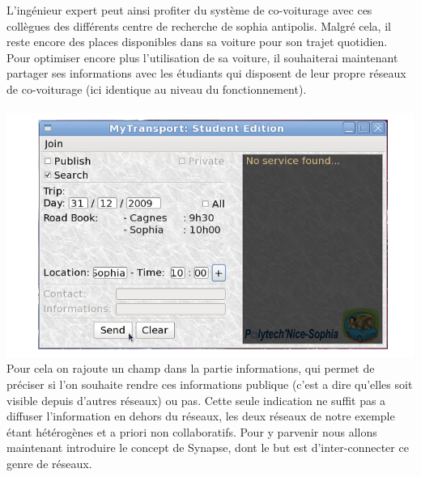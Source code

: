L'ingénieur expert peut ainsi profiter du système de co-voiturage avec ces collègues des différents centre de recherche de sophia antipolis. Malgré cela, il reste encore des places disponibles dans sa voiture pour son trajet quotidien. Pour optimiser encore plus l'utilisation de sa voiture, il souhaiterai maintenant partager ses informations avec les étudiants qui disposent de leur propre réseaux de co-voiturage (ici identique au niveau du fonctionnement).\\

~~~~~~~~~ \includegraphics[scale=0.4]{img/screenshot/studentSub}\\

Pour cela on rajoute un champ dans la partie informations, qui permet de préciser si l'on souhaite rendre ces informations publique (c'est a dire qu'elles soit visible depuis d'autres réseaux) ou pas.
Cette seule indication ne suffit pas a diffuser l'information en dehors du réseaux, les deux réseaux de notre exemple étant hétérogènes et a priori non collaboratifs. Pour y parvenir nous allons maintenant introduire le concept de Synapse, dont le but est d'inter-connecter ce genre de réseaux.

